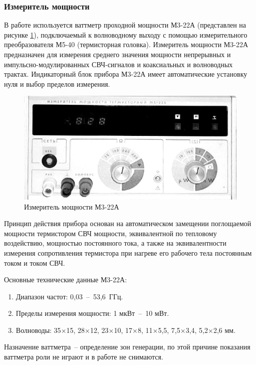 \documentclass[a4paper,14pt]{extarticle}
\begin{document}
	\subsubsection{Измеритель мощности}

	В работе используется ваттметр проходной мощности М3-22А (представлен на рисунке \ref{figm}), подключаемый к волноводному выходу с помощью измерительного преобразователя М5-40 (термисторная головка). Измеритель мощности М3-22А предназначен для измерения среднего значения мощности непрерывных и импульсно-модулированных СВЧ-сигналов и коаксиальных и волноводных трактах. Индикаторный блок прибора М3-22А имеет автоматические установку нуля и выбор пределов измерения.
	
	\begin{figure}[h]
		\center
		\includegraphics[width = \textwidth]{images/m3-22a.png}
		\caption{Измеритель мощности М3-22А}
		\label{figm}
	\end{figure}
	
	Принцип действия прибора основан на автоматическом замещении поглощаемой мощности термистором СВЧ мощности, эквивалентной по тепловому воздействию, мощностью постоянного тока, а также на эквивалентности измерения сопротивления термистора при нагреве его рабочего тела постоянным током и током СВЧ.
	
	Основные технические данные М3-22А:
	\begin{enumerate}
		\item	Диапазон частот: 0,03~--~53,6~ГГц.
		\item	Пределы измерения мощности: 1 мкВт~--~10 мВт.
		\item	Волноводы: 35$\times$15, 28$\times$12, 23$\times$10, 17$\times$8, 11$\times$5,5, 7,5$\times$3,4, 5,2$\times$2,6 мм.
	\end{enumerate}
	
	Назначение ваттметра~-- определение зон генерации, по этой причине показания ваттметра роли не играют и в работе не снимаются. 
	
\end{document}
